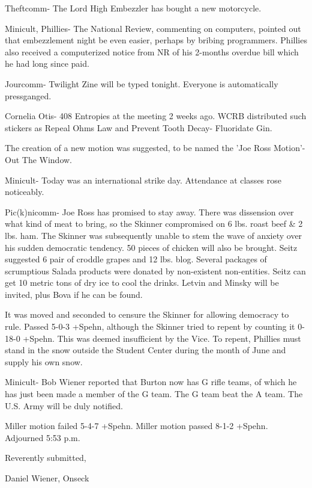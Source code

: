 \documentclass[12pt]{article}
\begin{document}
Theftcomm- The Lord High Embezzler has bought a new motorcycle.

Minicult, Phillies- The National Review, commenting on computers, pointed out that embezzlement night be even easier, perhaps by bribing programmers. Phillies also received a computerized notice from NR of his 2-months overdue bill which he had long since paid.

Jourcomm- Twilight Zine will be typed tonight. Everyone is automatically pressganged.

Cornelia Otis- 408 Entropies at the meeting 2 weeks ago. WCRB distributed such stickers as Repeal Ohms Law and Prevent Tooth Decay- Fluoridate Gin.

The creation of a new motion was suggested, to be named the 'Joe Ross Motion'- Out The Window.

Minicult- Today was an international strike day. Attendance at classes rose noticeably.

Pic(k)nicomm- Joe Ross has promised to stay away. There was dissension over what kind of meat to bring, so the Skinner compromised on 6 lbs. roast beef & 2 lbs. ham. The Skinner was subsequently unable to stem the wave of anxiety over his sudden democratic tendency. 50 pieces of chicken will also be brought. Seitz suggested 6 pair of croddle grapes and 12 lbs. blog. Several packages of scrumptious Salada products were donated by non-existent non-entities. Seitz can get 10 metric tons of dry ice to cool the drinks. Letvin and Minsky will be invited, plus Bova if he can be found.

It was moved and seconded to censure the Skinner for allowing democracy to rule. Passed 5-0-3 +Spehn, although the Skinner tried to repent by counting it 0-18-0 +Spehn. This was deemed insufficient by the Vice. To repent, Phillies must stand in the snow outside the Student Center during the month of June and supply his own snow.

Minicult- Bob Wiener reported that Burton now has G rifle teams, of which he has just been made a member of the G team. The G team beat the A team. The U.S. Army will be duly notified.

Miller motion failed 5-4-7 +Spehn. Miller motion passed 8-1-2 +Spehn. Adjourned 5:53 p.m.

\vspace{12pt}

\centerline{Reverently submitted,}
\centerline{Daniel Wiener, Onseck}
\end{document}
